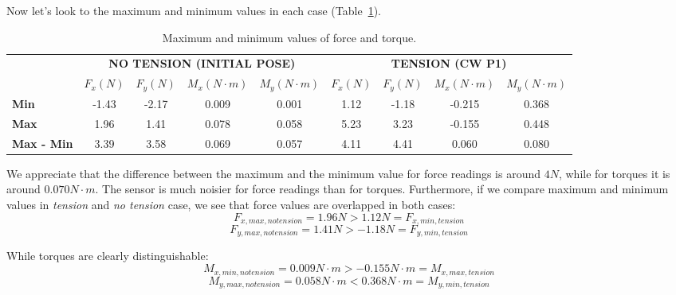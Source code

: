 Now let's look to the maximum and minimum values in each case (Table~\ref{tab:maxmin}).
\begin{table}[htbp]
	\centering
	\begin{tabular}{l|c|c|c|c|c|c|c|c|}
		\cmidrule{2-9}
		& \multicolumn{4}{c|}{\textbf{NO TENSION (INITIAL POSE)}} & \multicolumn{4}{c|}{\textbf{TENSION (CW P1)}} \\
		\cmidrule{2-9}
		\multicolumn{1}{r|}{} & \textbf{$F_{x} (N)$} & \textbf{$F_{y} (N)$} & \textbf{$M_{x} (N \cdot m)$} & \textbf{$M_{y} (N \cdot m)$} & \textbf{$F_{x} (N)$} & \textbf{$F_{y} (N)$} & \textbf{$M_{x} (N \cdot m)$} & \textbf{$M_{y} (N \cdot m)$} \\
		\midrule
		\multicolumn{1}{|l|}{\textbf{Min}} & -1.43 & -2.17 & 0.009 & 0.001 & 1.12  & -1.18 & -0.215 & 0.368 \\
		\midrule
		\multicolumn{1}{|l|}{\textbf{Max}} & 1.96  & 1.41  & 0.078 & 0.058 & 5.23  & 3.23  & -0.155 & 0.448 \\
		\midrule
		\multicolumn{1}{|l|}{\textbf{Max - Min}} & 3.39  & 3.58  & 0.069 & 0.057 & 4.11  & 4.41  & 0.060 & 0.080 \\
		\bottomrule
	\end{tabular}%
	\caption{Maximum and minimum values of force and torque.}
	\label{tab:maxmin}%
\end{table}%

We appreciate that the difference between the maximum and the minimum value for force readings is around $4 N$, while for torques it is around $0.070 N \cdot m$. The sensor is much noisier for force readings than for torques. Furthermore, if we compare maximum and minimum values in \textit{tension} and \textit{no tension} case, we see that force values are overlapped in both cases:
\[ F_{x, max, no tension} = 1.96 N > 1.12 N = F_{x, min, tension} \]
\[ F_{y, max, no tension} = 1.41 N > -1.18 N = F_{y, min, tension} \]

While torques are clearly distinguishable:
\[ M_{x, min, no tension} = 0.009 N\cdot m > -0.155 N\cdot m = M_{x, max, tension} \]
\[ M_{y, max, no tension} = 0.058 N\cdot m < 0.368 N\cdot m = M_{y, min, tension} \]

